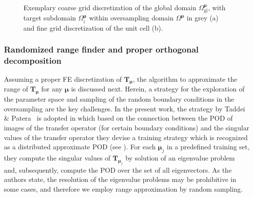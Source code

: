 \documentclass[a4paper]{eccomas_paper-2024}
\newcommand{\m}{\bm\mu}
\newcommand{\gl}{\mathrm{gl}}
\begin{document}
\begin{figure}
    \centering
    
    \caption{Exemplary coarse grid discretization of the global domain $\varOmega^{\m}_{\gl}$, with target subdomain $\varOmega^{\m}_i$ within oversampling domain $\varOmega^{\m}$ in grey (a) and fine grid discretization of the unit cell (b).}\label{fig:oversampling_domain}
\end{figure}



\subsubsection{Randomized range finder and proper orthogonal decomposition} %
\label{sec:Randomized range finder and POD}

Assuming a proper FE discretization of $\bm{T}_{\m}$, the algorithm to approximate the range of $\bm{T}_{\m}$ for any $\m$ is discussed next.
Herein, a strategy for the exploration of the parameter space and sampling of the random boundary conditions in the oversampling are the key challenges.
In the present work, the strategy by Taddei \& Patera~\cite{Taddei2018Localization} is adopted in which based on the connection between the POD of images of the transfer operator (for certain boundary conditions) and the singular values of the transfer operator they devise a training strategy which is recognized as a distributed approximate POD (see \cite{Himpe2018Hierarchical}).
For each $\m_j$ in a predefined training set, they compute the singular values of $\bm{T}_{\m_j}$ by solution of an eigenvalue problem and, subsequently, compute the POD over the set of all eigenvectors.
As the authors state, the resolution of the eigenvalue problems may be prohibitive in some cases, and therefore we employ range approximation by random sampling.
\end{document}
